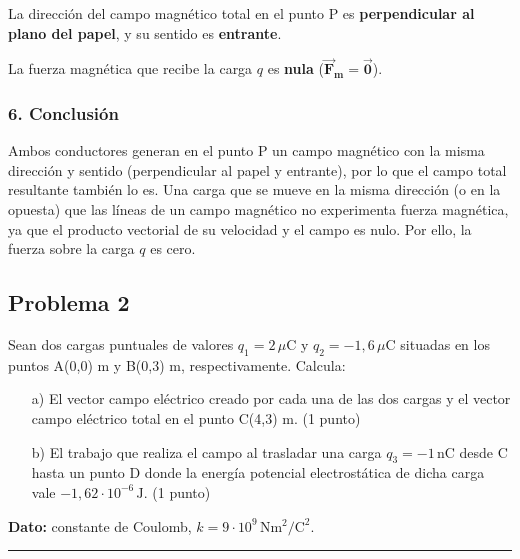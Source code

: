 \begin{cajaresultado}
    La dirección del campo magnético total en el punto P es \textbf{perpendicular al plano del papel}, y su sentido es \textbf{entrante}.
\end{cajaresultado}

\begin{cajaresultado}
    La fuerza magnética que recibe la carga $q$ es \textbf{nula} ($\boldsymbol{\vec{F}_m = \vec{0}}$).
\end{cajaresultado}

\subsubsection*{6. Conclusión}
\begin{cajaconclusion}
Ambos conductores generan en el punto P un campo magnético con la misma dirección y sentido (perpendicular al papel y entrante), por lo que el campo total resultante también lo es.
Una carga que se mueve en la misma dirección (o en la opuesta) que las líneas de un campo magnético no experimenta fuerza magnética, ya que el producto vectorial de su velocidad y el campo es nulo. Por ello, la fuerza sobre la carga $q$ es cero.
\end{cajaconclusion}

\newpage

\subsection{Problema 2}
\label{subsec:P2_2021_jun_ord}
\begin{cajaenunciado}
Sean dos cargas puntuales de valores $q_1 = 2\,\mu\text{C}$ y $q_2 = -1,6\,\mu\text{C}$ situadas en los puntos A(0,0) m y B(0,3) m, respectivamente. Calcula:
\begin{enumerate}
    \item[a)] El vector campo eléctrico creado por cada una de las dos cargas y el vector campo eléctrico total en el punto C(4,3) m. (1 punto)
    \item[b)] El trabajo que realiza el campo al trasladar una carga $q_3 = -1\,\text{nC}$ desde C hasta un punto D donde la energía potencial electrostática de dicha carga vale $-1,62 \cdot 10^{-6}\,\text{J}$. (1 punto)
\end{enumerate}
\textbf{Dato:} constante de Coulomb, $k=9\cdot10^9\,\text{N}\text{m}^2/\text{C}^2$.
\end{cajaenunciado}
\hrule

